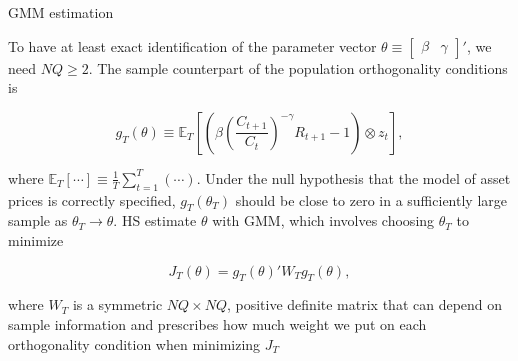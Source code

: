 \documentclass[xcolor=table, aspectratio=169]{beamer}
\newcommand{\E}{\mathbb{E}}
\begin{document}
\begin{frame}{GMM estimation}

To have at least exact identification of the parameter vector $\theta \equiv \left[ \begin{array}{cc}\beta & \gamma \end{array} \right]'$, we need $NQ \geq 2$. The sample counterpart of the population orthogonality conditions is

$$g_T(\theta) \equiv \E_T \left[\left(\beta\left(\dfrac{C_{t+1}}{C_t}\right)^{-\gamma} R_{t+1}-1\right) \otimes z_t\right], $$

where $\E_T[\cdots]\equiv \frac{1}{T}\sum^T_{t=1}(\cdots)$. Under the null hypothesis that the model of asset prices is correctly specified, $g_T(\theta_T)$ should be close to zero in a sufficiently large sample as $\theta_T \rightarrow \theta$. HS estimate $\theta$ with GMM, which involves choosing $\theta_T$ to minimize

$$J_T(\theta) = g_T(\theta)' W_T g_T(\theta),$$

where $W_T$ is a symmetric $NQ \times NQ$, positive definite matrix that can depend on sample information and prescribes how much weight we put on each orthogonality condition when minimizing $J_T$

\end{frame}

    







\end{document}
